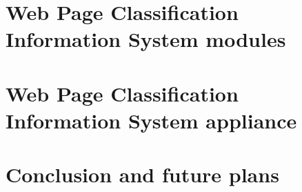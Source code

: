 \documentclass[9pt,a4paper]{extarticle}
\begin{document}
\begin{multicols}{2}
\section{Web Page Classification Information System modules}

\section{Web Page Classification Information System appliance}

\section{Conclusion and future plans}







\end{multicols}
\end{document}
